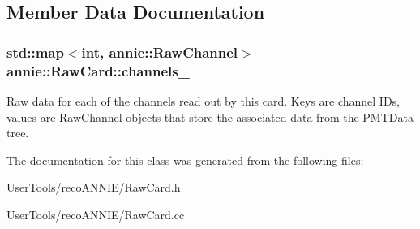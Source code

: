\subsection{Member Data Documentation}
\hypertarget{classannie_1_1RawCard_a2511d83c56ea8107a92c27bf4c9d662b}{
\subsubsection[{channels\_\-}]{\setlength{\rightskip}{0pt plus 5cm}std::map$<$int, {\bf annie::RawChannel}$>$ {\bf annie::RawCard::channels\_\-}}}
\label{classannie_1_1RawCard_a2511d83c56ea8107a92c27bf4c9d662b}


Raw data for each of the channels read out by this card. Keys are channel IDs, values are \hyperlink{classannie_1_1RawChannel}{RawChannel} objects that store the associated data from the \hyperlink{classPMTData}{PMTData} tree. 

The documentation for this class was generated from the following files:\begin{DoxyCompactItemize}
\item 
UserTools/recoANNIE/RawCard.h\item 
UserTools/recoANNIE/RawCard.cc\end{DoxyCompactItemize}

